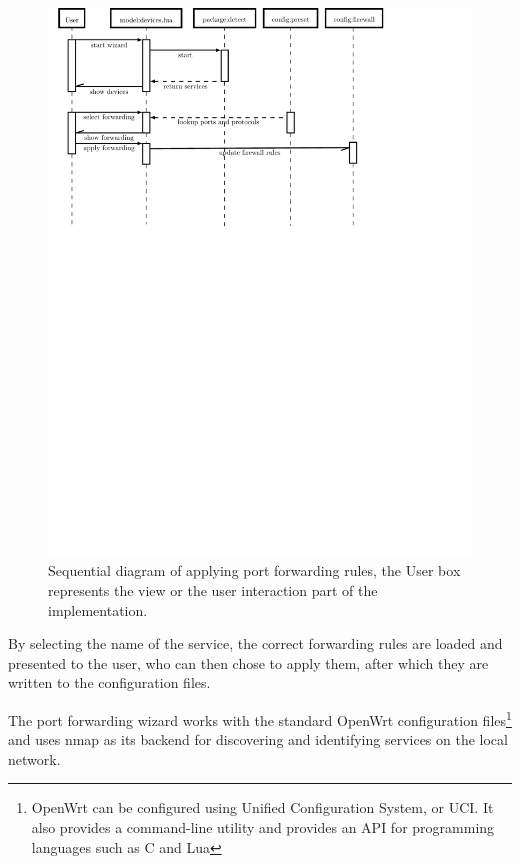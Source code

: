 \documentclass[a4paper,11pt,makeidx]{kth-bcs}
\begin{document}
\begin{figure}[h!]
   \centering
   \includegraphics[trim = 0mm 195mm 30mm 0mm, clip, width=15cm,natwidth=1.0in,natheight=1.0in]{wizard-seq_dia}
   \caption{Sequential diagram of applying port forwarding rules, the User box represents the view or the user interaction part of the implementation.}
   \label{fig:wizard-seq_dia}
\end{figure}

By selecting the name of the service, the correct forwarding rules are loaded and presented to the user, who can then chose to apply them, after which they are written to the configuration files.

The port forwarding wizard works with the standard OpenWrt configuration files\footnote{OpenWrt can be configured using Unified Configuration System, or UCI. It also provides a command-line utility and provides an API for programming languages such as C and Lua} and uses nmap as its backend for discovering and identifying services on the local network.
\end{document}
